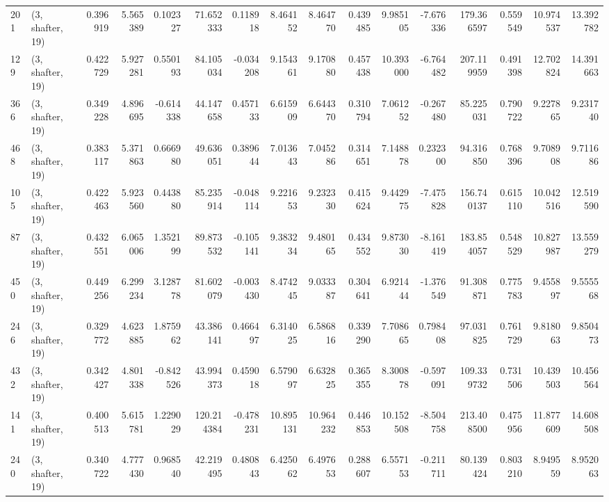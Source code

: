 \begin{tabular}{llrrrrrrrrrrrrrr}
201 &  (3, shafter, 19) &   0.396919 &   5.565389 &   0.102327 &    71.652333 &   0.118918 &   8.464152 &   8.464770 &  0.439485 &   9.985105 &  -7.676336 &   179.366597 &  0.559549 &  10.974537 &  13.392782 \\
129 &  (3, shafter, 19) &   0.422729 &   5.927281 &   0.550193 &    84.105034 &  -0.034208 &   9.154361 &   9.170880 &  0.457438 &  10.393000 &  -6.764482 &   207.119959 &  0.491398 &  12.702824 &  14.391663 \\
366 &  (3, shafter, 19) &   0.349228 &   4.896695 &  -0.614338 &    44.147658 &   0.457133 &   6.615909 &   6.644370 &  0.310794 &   7.061252 &  -0.267480 &    85.225031 &  0.790722 &   9.227865 &   9.231740 \\
468 &  (3, shafter, 19) &   0.383117 &   5.371863 &   0.666980 &    49.636051 &   0.389644 &   7.013643 &   7.045286 &  0.314651 &   7.148878 &   0.232300 &    94.316850 &  0.768396 &   9.708908 &   9.711686 \\
105 &  (3, shafter, 19) &   0.422463 &   5.923560 &   0.443880 &    85.235914 &  -0.048114 &   9.221653 &   9.232330 &  0.415624 &   9.442975 &  -7.475828 &   156.740137 &  0.615110 &  10.042516 &  12.519590 \\
87  &  (3, shafter, 19) &   0.432551 &   6.065006 &   1.352199 &    89.873532 &  -0.105141 &   9.383234 &   9.480165 &  0.434552 &   9.873030 &  -8.161419 &   183.854057 &  0.548529 &  10.827987 &  13.559279 \\
450 &  (3, shafter, 19) &   0.449256 &   6.299234 &   3.128778 &    81.602079 &  -0.003430 &   8.474245 &   9.033387 &  0.304641 &   6.921444 &  -1.376549 &    91.308871 &  0.775783 &   9.455897 &   9.555568 \\
246 &  (3, shafter, 19) &   0.329772 &   4.623885 &   1.875962 &    43.386141 &   0.466497 &   6.314025 &   6.586816 &  0.339290 &   7.708665 &   0.798408 &    97.031825 &  0.761729 &   9.818063 &   9.850473 \\
432 &  (3, shafter, 19) &   0.342427 &   4.801338 &  -0.842526 &    43.994373 &   0.459018 &   6.579097 &   6.632825 &  0.365355 &   8.300878 &  -0.597091 &   109.339732 &  0.731506 &  10.439503 &  10.456564 \\
141 &  (3, shafter, 19) &   0.400513 &   5.615781 &   1.229029 &   120.214384 &  -0.478231 &  10.895131 &  10.964232 &  0.446853 &  10.152508 &  -8.504758 &   213.408500 &  0.475956 &  11.877609 &  14.608508 \\
240 &  (3, shafter, 19) &   0.340722 &   4.777430 &   0.968540 &    42.219495 &   0.480843 &   6.425062 &   6.497653 &  0.288607 &   6.557153 &  -0.211711 &    80.139424 &  0.803210 &   8.949559 &   8.952063 \\

\end{tabular}
